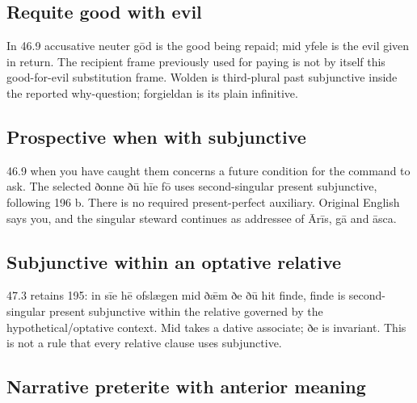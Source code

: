 \subsection*{Requite good with evil}

In 46.9 accusative neuter gōd is the good being repaid; mid yfele is the evil given in return. The recipient frame previously used for paying is not by itself this good-for-evil substitution frame. Wolden is third-plural past subjunctive inside the reported why-question; forgieldan is its plain infinitive.

\subsection*{Prospective when with subjunctive}

46.9 when you have caught them concerns a future condition for the command to ask. The selected ðonne ðū hīe fō uses second-singular present subjunctive, following 196 b. There is no required present-perfect auxiliary. Original English says you, and the singular steward continues as addressee of Ārīs, gā and āsca.

\subsection*{Subjunctive within an optative relative}

47.3 retains 195: in sīe hē ofslægen mid ðǣm ðe ðū hit finde, finde is second-singular present subjunctive within the relative governed by the hypothetical/\allowbreak{}optative context. Mid takes a dative associate; ðe is invariant. This is not a rule that every relative clause uses subjunctive.

\subsection*{Narrative preterite with anterior meaning}


